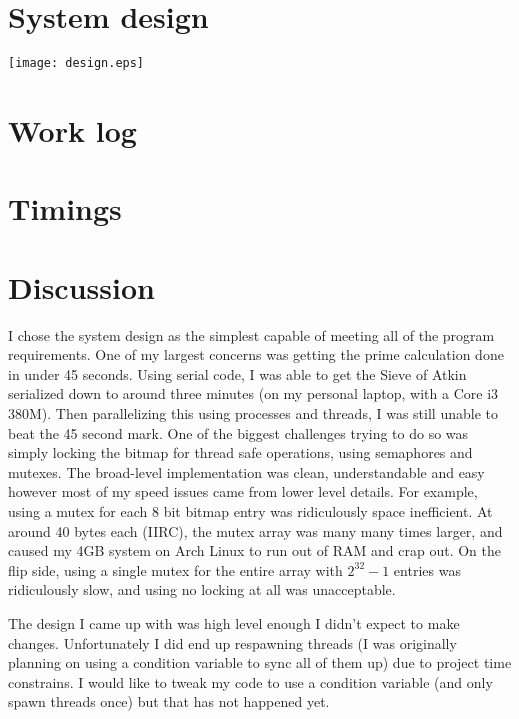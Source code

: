 \documentclass[letterpaper,10pt,titlepage]{article}
\begin{document}
\section{System design}
\texttt{[image: design.eps]}

\section{Work log}


\section{Timings}

\section{Discussion}
I chose the system design as the simplest capable of meeting all of the program
requirements. One of my largest concerns was getting the prime calculation done
in under 45 seconds. Using serial code, I was able to get the Sieve of Atkin
serialized down to around three minutes (on my personal laptop, with a Core
i3 380M). Then parallelizing this using processes and threads, I was still
unable to beat the 45 second mark. One of the biggest challenges trying to do
so was simply locking the bitmap for thread safe operations, using semaphores
and mutexes. The broad-level implementation was clean, understandable and easy
however most of my speed issues came from lower level details. For example,
using a mutex for each 8 bit bitmap entry was ridiculously space inefficient.
At around 40 bytes each (IIRC), the mutex array was many many times larger, and
caused my 4GB system on Arch Linux to run out of RAM and crap out. On the flip
side, using a single mutex for the entire array with $2^{32} - 1$ entries was
ridiculously slow, and using no locking at all was unacceptable.

The design I came up with was high level enough I didn't expect to make changes.
Unfortunately I did end up respawning threads (I was originally planning on
using a condition variable to sync all of them up) due to project time constrains.
I would like to tweak my code to use a condition variable (and only spawn threads
once) but that has not happened yet.
\end{document}
